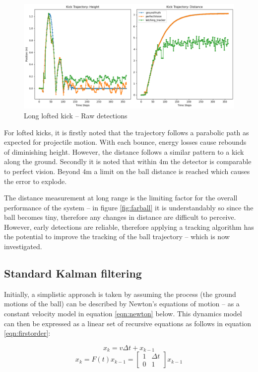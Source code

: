 \documentclass[a4paper,twoside,12pt]{report}
\begin{document}
\begin{figure}[h!]
\begin{center}
\includegraphics[width=14cm]{images/raw_loft_long.png}
\caption{Long lofted kick -- Raw detections}
\label{fig:rawloftlong}
\end{center}
\end{figure}

For lofted kicks, it is firstly noted that the trajectory follows a parabolic path as expected for projectile motion. With each bounce, energy losses cause rebounds of diminishing height. However, the distance follows a similar pattern to a kick along the ground. Secondly it is noted that within 4m the detector is comparable to perfect vision. Beyond 4m a limit on the ball distance is reached which causes the error to explode. 

The distance measurement at long range is the limiting factor for the overall performance of the system -- in figure \ref{fig:farball} it is understandably so since the ball becomes tiny, therefore any changes in distance are difficult to perceive. However, early detections are reliable, therefore applying a tracking algorithm has the potential to improve the tracking of the ball trajectory -- which is now investigated.

\subsection{Standard Kalman filtering}

Initially, a simplistic approach is taken by assuming the process (the ground motions of the ball) can be described by Newton's equations of motion -- as a constant velocity model in equation \ref{eqn:newton} below. This dynamics model can then be expressed as a linear set of recursive equations as follows in equation \ref{eqn:firstorder}:

\begin{equation} 
x_k=v\Delta t + x_{k-1}
\label{eqn:newton}
\end{equation}
\begin{equation} 
x_k
=
F(t)x_{k-1}
=
\begin{bmatrix}
    1 & \Delta t \\
    0 & 1 
\end{bmatrix}
x_{k-1}
\label{eqn:firstorder}
\end{equation}
\end{document}
